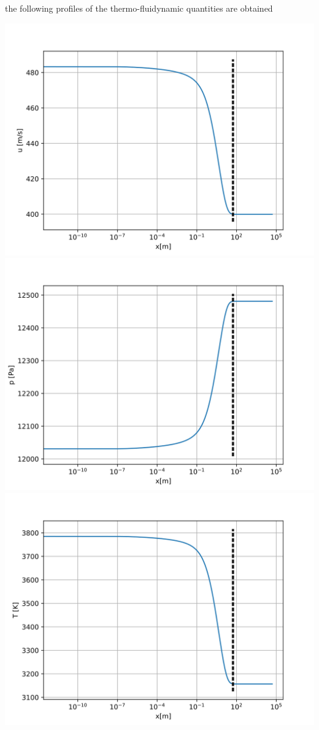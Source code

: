 \documentclass[
]{article}
\begin{document}
the following profiles of the thermo-fluidynamic quantities are obtained

\includegraphics{images/45km/u.svg}\\
\includegraphics{images/45km/p.svg}\\
\includegraphics{images/45km/T.svg}\\
\end{document}
